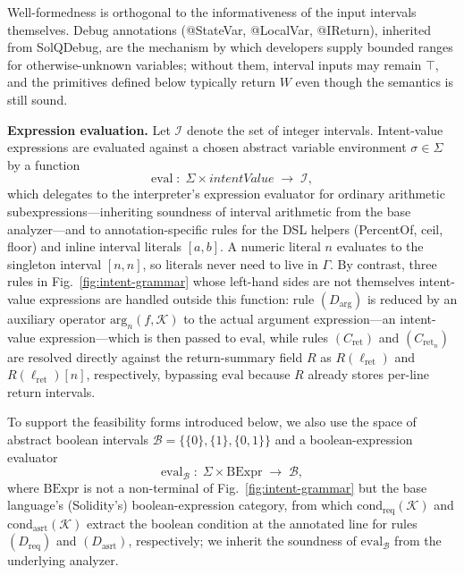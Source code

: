 \documentclass[pdflatex,sn-basic]{sn-jnl}%
\theoremstyle{thmstyleone}%
\theoremstyle{thmstyletwo}%
\theoremstyle{thmstylethree}%
\begin{document}
Well-formedness is orthogonal to the informativeness of the input intervals themselves.
Debug annotations (@StateVar, @LocalVar, @IReturn), inherited from SolQDebug, are the mechanism by which developers supply bounded ranges for otherwise-unknown variables; without them, interval inputs may remain $\top$, and the primitives defined below typically return $W$ even though the semantics is still sound.

\smallskip
\noindent\textbf{Expression evaluation.}
Let $\mathcal{I}$ denote the set of integer intervals.
Intent-value expressions are evaluated against a chosen abstract variable environment $\sigma \in \Sigma$ by a function
\[
\text{eval} \;:\; \Sigma \times \mathit{intentValue} \;\to\; \mathcal{I},
\]
which delegates to the interpreter's expression evaluator for ordinary arithmetic subexpressions---inheriting soundness of interval arithmetic from the base analyzer---and to annotation-specific rules for the DSL helpers (PercentOf, ceil, floor) and inline interval literals $[a, b]$.
A numeric literal $n$ evaluates to the singleton interval $[n, n]$, so literals never need to live in $\Gamma$.
By contrast, three rules in Fig.~\ref{fig:intent-grammar} whose left-hand sides are not themselves intent-value expressions are handled outside this function: rule $(D_{\text{arg}})$ is reduced by an auxiliary operator $\text{arg}_n(f, \mathcal{K})$ to the actual argument expression---an intent-value expression---which is then passed to $\text{eval}$, while rules $(C_{\text{ret}})$ and $(C_{\text{ret}_n})$ are resolved directly against the return-summary field $R$ as $R(\ell_{\text{ret}})$ and $R(\ell_{\text{ret}})[n]$, respectively, bypassing $\text{eval}$ because $R$ already stores per-line return intervals.

To support the feasibility forms introduced below, we also use the space of abstract boolean intervals $\mathcal{B} = \{\{0\}, \{1\}, \{0, 1\}\}$ and a boolean-expression evaluator
\[
\text{eval}_{\mathcal{B}} \;:\; \Sigma \times \text{BExpr} \;\to\; \mathcal{B},
\]
where $\text{BExpr}$ is not a non-terminal of Fig.~\ref{fig:intent-grammar} but the base language's (Solidity's) boolean-expression category, from which $\text{cond}_{\text{req}}(\mathcal{K})$ and $\text{cond}_{\text{asrt}}(\mathcal{K})$ extract the boolean condition at the annotated line for rules $(D_{\text{req}})$ and $(D_{\text{asrt}})$, respectively; we inherit the soundness of $\text{eval}_{\mathcal{B}}$ from the underlying analyzer.
\end{document}
